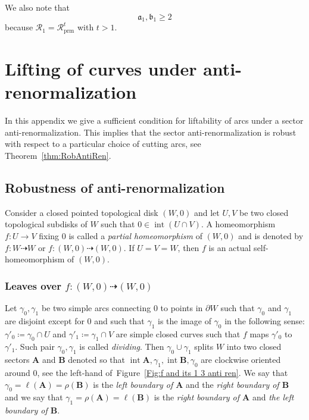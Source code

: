 \documentclass[]{amsart}
\newcommand\RR{\mathcal{R}}
\newcommand\prm{{\operatorname{prm}}}
\newcommand\RRc{\mathcal{R}_{\prm}}
\newcommand\intr{\operatorname{int}}
\renewcommand{\aa}{{\mathfrak{a}}}
\newcommand{\bb}{{\mathfrak{b}}}
\newcommand{\A}{\mathbf A}
\newcommand{\B}{\mathbf B}
\theoremstyle{remark}
\numberwithin{equation}{section}
\theoremstyle{definition}
\begin{document}
We also note that 
\begin{equation}
\label{eq:app:aa1 bb1}
\aa_1,\bb_1\ge 2
\end{equation}
because $\RR_1=\RRc^t$ with $t>1$.



\section{Lifting of curves under anti-renormalization}
\label{s:SectRenAndAntiren}


In this appendix we give a sufficient condition for liftability of arcs under a sector  anti-renormalization. This implies that the sector anti-renormalization is robust with respect to a particular choice of cutting arcs, see Theorem~\ref{thm:RobAntiRen}.  




\subsection{Robustness of anti-renormalization}
\label{ss:A1}


Consider a closed pointed topological disk $(W, 0)$ and let $U,V$ be two closed topological subdisks of $W$ such that $0\in \intr(U\cap V)$. 
A homeomorphism $f\colon U\to V$ fixing $0$ is called a \emph{partial homeomorphism} of $(W,0)$ and is denoted by $f\colon W\dashrightarrow W$ or
$f\colon (W,0)\dashrightarrow (W,0)$. If $U=V=W$, then $f$ is an actual self-homeomorphism of $(W,0)$.

\subsubsection{Leaves over \boldmath$f\colon (W,0)\dashrightarrow (W,0)$}

Let $\gamma_0, \gamma_1$ be two simple arcs connecting $0$ to points in  $\partial W$ such that $\gamma_0$ and $\gamma_1$ are disjoint except for $0$ and such that $\gamma_1$ is the image of $\gamma_0$ in the following sense: $\gamma'_0\coloneqq \gamma_0\cap U$ and  $\gamma'_1\coloneqq \gamma_1\cap V$ are simple closed curves such that $f$ maps $\gamma'_0$ to $\gamma'_1$. Such pair $\gamma_0, \gamma_1$ is called \emph{dividing}. Then $\gamma_0 \cup \gamma_1$ splits $W$ into two closed sectors $\A$ and $\B$ denoted so that $\intr \A, \gamma_1,\intr \B,\gamma_0$ are clockwise oriented around $0$, see the left-hand of~Figure~\ref{Fig:f and its 1 3 anti ren}. We say that $\gamma_0=\ell(\A)=\rho(\B)$ is the \emph{left boundary of $\A$} and the \emph{right boundary of $\B$} and we say that $\gamma_1=\rho(\A)=\ell(\B)$ is the \emph{right boundary of $\A$} and \emph{the left boundary of $\B$}. 
\end{document}
